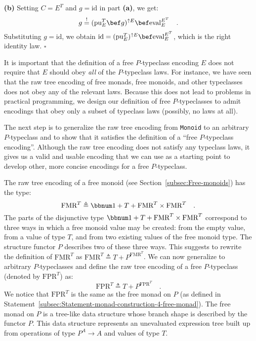 \textbf{(b)} Setting $C=E^{T}$ and $g=\text{id}$ in part \textbf{(a)},
we get:
\[
g\overset{!}{=}(\text{pu}_{E}^{T}\bef g)^{\uparrow E}\bef\text{eval}_{E}^{E^{T}}\quad.
\]
Substituting $g=\text{id}$, we obtain $\text{id}=(\text{pu}_{E}^{T})^{\uparrow E}\bef\text{eval}_{E}^{E^{T}}$,
which is the right identity law. $\square$

It is important that the definition of a free $P$-typeclass encoding
$E$ does not require that $E$ should obey \emph{all} of the $P$-typeclass
laws. For instance, we have seen that the raw tree encoding of free
monads, free monoids, and other typeclasses does not obey any of the
relevant laws. Because this does not lead to problems in practical
programming, we design our definition of free $P$-typeclasses to
admit encodings that obey only a subset of typeclass laws (possibly,
no laws at all).

The next step is to generalize the raw tree encoding from \lstinline!Monoid!
to an arbitrary $P$-typeclass and to show that it satisfies the definition
of a \textsf{``}free $P$-typeclass encoding\textsf{''}. Although the raw tree encoding
does not satisfy any typeclass laws, it gives us a valid and usable
encoding that we can use as a starting point to develop other, more
concise encodings for a free $P$-typeclass. 

The raw tree encoding of a free monoid (see Section~\ref{subsec:Free-monoids})
has the type: 
\[
\text{FMR}^{T}\triangleq\bbnum 1+T+\text{FMR}^{T}\times\text{FMR}^{T}\quad.
\]
The parts of the disjunctive type $\bbnum 1+T+\text{FMR}^{T}\times\text{FMR}^{T}$
correspond to three ways in which a free monoid value may be created:
from the empty value, from a value of type $T$, and from two existing
values of the free monoid type. The structure functor $P$ describes
two of these three ways. This suggests to rewrite the definition of
$\text{FMR}^{T}$ as $\text{FMR}^{T}\triangleq T+P^{\text{FMR}^{T}}$.
We can now generalize to arbitrary $P$-typeclasses and define the
raw tree encoding of a free $P$-typeclass (denoted by $\text{FPR}^{T}$)
as:
\[
\text{FPR}^{T}\triangleq T+P^{\text{FPR}^{T}}\quad.
\]
We notice that $\text{FPR}^{T}$ is the same as the free monad
on $P$ (as defined in Statement~\ref{subsec:Statement-monad-construction-4-free-monad}).
The free monad on $P$ is a tree-like data structure whose branch
shape is described by the functor $P$. This data structure represents
an unevaluated expression tree built up from operations of type $P^{A}\rightarrow A$
and values of type $T$. 

